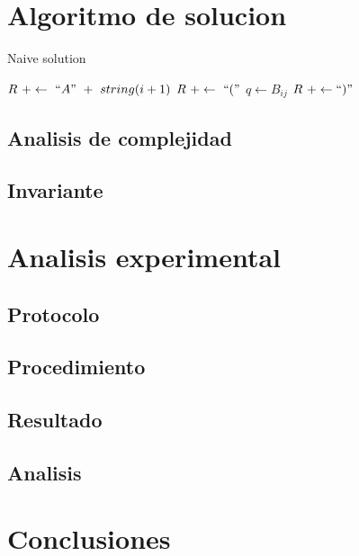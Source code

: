 \documentclass[letter]{article}
\begin{document}
\section{Algoritmo de solucion}
\begin{algorithm}[!htb]
	\caption{Naive solution}
	\begin{algorithmic}[1]
		\State $R ~ +\gets ~ ``A" ~ + ~ string(i+1)$
		\Else
		\State $R ~ +\gets ~ ``(" $
		\State $q \gets B_{ij}$
		\State {}
		\State {}
		\State $R ~ +\gets ``)"$
		\EndIf
		\EndProcedure
	\end{algorithmic}
\end{algorithm}
\subsection{Analisis de complejidad}
\subsection{Invariante}
\section{Analisis experimental}
\subsection{Protocolo}
\subsection{Procedimiento}
\subsection{Resultado}
\subsection{Analisis}
\section{Conclusiones}
\end{document}
